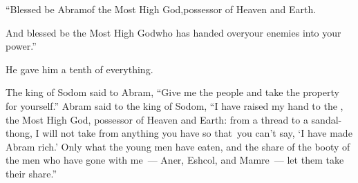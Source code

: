 \begin{inparaenum}
  \pb ``Blessed be Abram\pa of the Most High God,\pa possessor of Heaven and Earth.%
  
  \pb {} And blessed be the Most High God\pa who has handed over\pa your enemies into your power.''\thinspace{}%
  
  \noindent He gave him a tenth of everything.
  
   The king of Sodom said to Abram, ``Give me the people and take the property for yourself.''%
   Abram said to the king of Sodom, ``I have raised my hand to the \lord, the Most High God, possessor of Heaven and Earth:%
   from a thread to a sandal-thong, I will not take from anything you have so that\understood\ you can't say, `I have made Abram rich.'%
   Only what the young men have eaten, and the share of the booty of the men who have gone with me~--- Aner, Eshcol, and Mamre~--- let them take their share.''%
\end{inparaenum}
